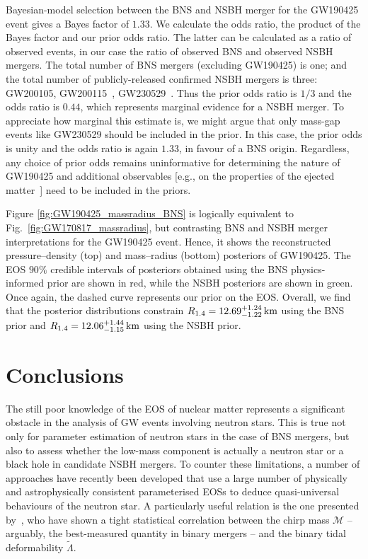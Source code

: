 \documentclass[twocolumn,linenumbers]{aastex631}
\begin{document}
Bayesian-model selection between the BNS and NSBH merger for the GW190425
event gives a Bayes factor of $1.33$.  We calculate the odds ratio, the
product of the Bayes factor and our prior odds ratio. The latter can be
calculated as a ratio of observed events, in our case the ratio of
observed BNS and observed NSBH mergers. The total number of BNS mergers
(excluding GW190425) is one; and the total number of publicly-released
confirmed NSBH mergers is three: GW200105, GW200115~\citep{GW200115},
GW230529~\citep{GW230529}. Thus the prior odds ratio is $1/3$ and the
odds ratio is $0.44$, which represents marginal evidence for a NSBH
merger. To appreciate how marginal this estimate is, we might argue that
only mass-gap events like GW230529 should be included in the prior. In
this case, the prior odds is unity and the odds ratio is again $1.33$, in
favour of a BNS origin. Regardless, any choice of prior odds remains
uninformative for determining the nature of GW190425 and additional
observables [e.g., on the properties of the ejected
  matter~\citep{Most:2021b}] need to be included in the priors.

Figure \ref{fig:GW190425_massradius_BNS} is logically equivalent to
Fig.~\ref{fig:GW170817_massradius}, but contrasting BNS and NSBH merger
interpretations for the GW190425 event. Hence, it shows the reconstructed
pressure--density (top) and mass--radius (bottom) posteriors of
GW190425. The EOS $90\%$ credible intervals of posteriors obtained using
the BNS physics-informed prior are shown in red, while the NSBH
posteriors are shown in green. Once again, the dashed curve represents
our prior on the EOS. Overall, we find that the posterior distributions
constrain $R_{1.4} = 12.69^{+1.24}_{-1.22} \, {\rm km}$ using the BNS
prior and $R_{1.4} = 12.06^{+1.44}_{-1.15} \, {\rm km}$ using the NSBH
prior.
	



\section{Conclusions}


The still poor knowledge of the EOS of nuclear matter represents a
significant obstacle in the analysis of GW events involving neutron
stars. This is true not only for parameter estimation of neutron stars in
the case of BNS mergers, but also to assess whether the low-mass
component is actually a neutron star or a black hole in candidate NSBH
mergers. To counter these limitations, a number of approaches have
recently been developed that use a large number of physically and
astrophysically consistent parameterised EOSs to deduce quasi-universal
behaviours of the neutron star. A particularly useful relation is the one
presented by~\cite{Altiparmak:2022}, who have shown a tight statistical
correlation between the chirp mass $\mathcal{M}$ -- arguably, the
best-measured quantity in binary mergers -- and the binary tidal
deformability $\tilde{\Lambda}$.
\end{document}

